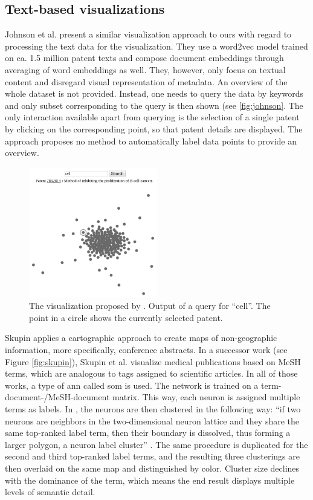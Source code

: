 \subsection{Text-based visualizations}

Johnson et al. \cite{Johnson} present a similar visualization approach to ours with regard to processing the text data for the visualization. 
They use a word2vec model trained on ca. 1.5 million patent texts and compose document embeddings through averaging of word embeddings as well.
They, however, only focus on textual content and disregard visual representation of metadata.
An overview of the whole dataset is not provided.
Instead, one needs to query the data by keywords and only subset corresponding to the query is then shown (see \autoref{fig:johnson}.
The only interaction available apart from querying is the selection of a single patent by clicking on the corresponding point, so that patent details are displayed.
The approach proposes no method to automatically label data points to provide an overview.

\begin{figure}[!]
\centering
\includegraphics[width=0.5\textwidth]{img/johnson}
\caption{The visualization proposed by \cite{Johnson}. Output of a query for ``cell''. The point in a circle shows the currently selected patent.}
\label{fig:johnson}
\end{figure}

Skupin \cite{Skupin2002} \cite{Skupin2004a} applies a cartographic approach to create maps of non-geographic information, more specifically, conference abstracts.
In a successor work (see Figure \autoref{fig:skupin}), Skupin et al. \cite{Skupin2013} visualize medical publications based on MeSH terms, which are analogous to tags assigned to scientific articles.
In all of those works, a type of \gls{ann} called \gls{som} is used. 
The network is trained on a term-document-/MeSH-document matrix. 
This way, each neuron is assigned multiple terms as labels.
In \cite{Skupin2013}, the neurons are then clustered in the following way: ``if two neurons are neighbors in the two-dimensional neuron lattice and they share the same top-ranked label term, then their boundary is dissolved, thus forming a larger polygon, a neuron label cluster'' \cite{Skupin2013}.
The same procedure is duplicated for the second and third top-ranked label terms, and the resulting three clusterings are then overlaid on the same map and distinguished by color.
Cluster size declines with the dominance of the term, which means the end result displays multiple levels of semantic detail.

